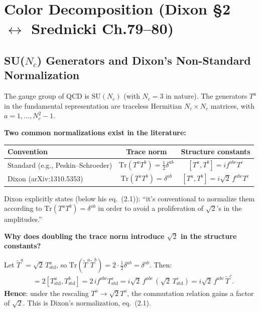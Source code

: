 \section{Color Decomposition (Dixon \S2 $\leftrightarrow$ Srednicki Ch.79--80)}
\label{sec:color-decomp}

\subsection{SU($N_c$) Generators and Dixon's Non-Standard Normalization}

The gauge group of QCD is $\mathrm{SU}(N_c)$ (with $N_c=3$ in nature).
The generators $T^a$ in the fundamental representation are
traceless Hermitian $N_c\times N_c$ matrices, with $a=1,\ldots,N_c^2-1$.

\textbf{Two common normalizations exist in the literature:}

\begin{center}
\renewcommand{\arraystretch}{1.5}
\begin{tabular}{@{}lcc@{}}
  \toprule
  Convention & Trace norm & Structure constants \\
  \midrule
  Standard (e.g., Peskin--Schroeder) & $\mathrm{Tr}(T^a T^b) = \tfrac{1}{2}\delta^{ab}$
    & $[T^a,T^b] = i f^{abc} T^c$ \\
  Dixon (arXiv:1310.5353) & $\mathrm{Tr}(T^a T^b) = \delta^{ab}$
    & $[T^a,T^b] = i\sqrt{2}\, f^{abc} T^c$ \\
  \bottomrule
\end{tabular}
\end{center}

Dixon explicitly states (below his eq.~(2.1)): ``it's conventional to normalize them
according to $\mathrm{Tr}(T^a T^b)=\delta^{ab}$ in order to avoid a proliferation
of $\sqrt{2}$'s in the amplitudes.''

\textbf{Why does doubling the trace norm introduce $\sqrt{2}$ in the structure constants?}

Let $\tilde{T}^a = \sqrt{2}\,T^a_{\mathrm{std}}$, so
$\mathrm{Tr}(\tilde{T}^a\tilde{T}^b)=2\cdot\tfrac{1}{2}\delta^{ab}=\delta^{ab}$.
Then:
\begin{align}
  [\tilde{T}^a, \tilde{T}^b]
  &= 2[T^a_{\mathrm{std}}, T^b_{\mathrm{std}}]
   = 2\,i f^{abc} T^c_{\mathrm{std}}
   = i\sqrt{2}\,f^{abc}\,(\sqrt{2}\,T^c_{\mathrm{std}})
   = i\sqrt{2}\,f^{abc}\,\tilde{T}^c.
\end{align}
\textbf{Hence}: under the rescaling $T^a\to\sqrt{2}T^a$, the commutation relation
gains a factor of $\sqrt{2}$. This is Dixon's normalization, eq.~(2.1).

